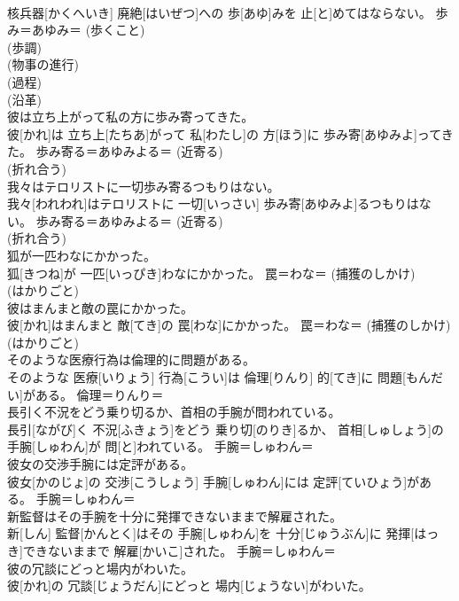 \documentclass[8pt]{extreport}
\begin{document}
\begin{CJK}{UTF8}{min}
{\\	核兵器[かくへいき] 廃絶[はいぜつ]への 歩[あゆ]みを 止[と]めてはならない。	歩み＝あゆみ＝ (歩くこと) 
\\	(歩調) 
\\	(物事の進行) 
\\	(過程) 
\\	(沿革) 
\\	彼は立ち上がって私の方に歩み寄ってきた。	
\\	彼[かれ]は 立ち上[たちあ]がって 私[わたし]の 方[ほう]に 歩み寄[あゆみよ]ってきた。	歩み寄る＝あゆみよる＝ (近寄る) 
\\	(折れ合う) 
\\	我々はテロリストに一切歩み寄るつもりはない。	
\\	我々[われわれ]はテロリストに 一切[いっさい] 歩み寄[あゆみよ]るつもりはない。	歩み寄る＝あゆみよる＝ (近寄る) 
\\	(折れ合う) 
\\	狐が一匹わなにかかった。	
\\	狐[きつね]が 一匹[いっぴき]わなにかかった。	罠＝わな＝ (捕獲のしかけ) 
\\	(はかりごと) 
\\	彼はまんまと敵の罠にかかった。	
\\	彼[かれ]はまんまと 敵[てき]の 罠[わな]にかかった。	罠＝わな＝ (捕獲のしかけ) 
\\	(はかりごと) 
\\	そのような医療行為は倫理的に問題がある。	
\\	そのような 医療[いりょう] 行為[こうい]は 倫理[りんり] 的[てき]に 問題[もんだい]がある。	倫理＝りんり＝ 
\\	長引く不況をどう乗り切るか、首相の手腕が問われている。	
\\	長引[ながび]く 不況[ふきょう]をどう 乗り切[のりき]るか、 首相[しゅしょう]の 手腕[しゅわん]が 問[と]われている。	手腕＝しゅわん＝ 
\\	彼女の交渉手腕には定評がある。	
\\	彼女[かのじょ]の 交渉[こうしょう] 手腕[しゅわん]には 定評[ていひょう]がある。	手腕＝しゅわん＝ 
\\	新監督はその手腕を十分に発揮できないままで解雇された。	
\\	新[しん] 監督[かんとく]はその 手腕[しゅわん]を 十分[じゅうぶん]に 発揮[はっき]できないままで 解雇[かいこ]された。	手腕＝しゅわん＝ 
\\	彼の冗談にどっと場内がわいた。	
\\	彼[かれ]の 冗談[じょうだん]にどっと 場内[じょうない]がわいた。	
}
\end{CJK}
\end{document}
